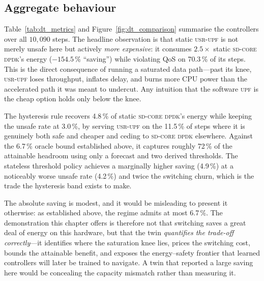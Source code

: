 \documentclass[12pt, a4paper]{report}
\newcommand{\dpdk}{\textsc{sd-core dpdk}}
\newcommand{\usr}{\textsc{usr-upf}}
\newcommand{\upf}{\textsc{upf}}
\begin{document}
\subsection{Aggregate behaviour}

Table~\ref{tab:dt_metrics} and Figure~\ref{fig:dt_comparison} summarise the
controllers over all $10{,}090$ steps. The headline observation is that static
\usr{} is not merely unsafe here but actively \emph{more expensive}: it
consumes $2.5\times$ static \dpdk{}'s energy ($-154.5$\,\% ``saving'') while
violating QoS on 70.3\,\% of its steps. This is the direct consequence of
running a saturated data path---past its knee, \usr{} loses throughput,
inflates delay, and burns more CPU power than the accelerated path it was
meant to undercut. Any intuition that the software \upf{} is the cheap option
holds only below the knee.

The hysteresis rule recovers 4.8\,\% of static \dpdk{}'s energy while keeping
the unsafe rate at 3.0\,\%, by serving \usr{} on the 11.5\,\% of steps where
it is genuinely both safe and cheaper and ceding to \dpdk{} elsewhere. Against
the 6.7\,\% oracle bound established above, it captures roughly 72\,\% of the
attainable headroom using only a forecast and two derived thresholds. The
stateless threshold policy achieves a marginally higher saving (4.9\,\%) at a
noticeably worse unsafe rate (4.2\,\%) and twice the switching churn, which is
the trade the hysteresis band exists to make.

The absolute saving is modest, and it would be misleading to present it
otherwise: as established above, the regime admits at most 6.7\,\%. The
demonstration this chapter offers is therefore not that switching saves a
great deal of energy on this hardware, but that the twin \emph{quantifies the
trade-off correctly}---it identifies where the saturation knee lies, prices
the switching cost, bounds the attainable benefit, and exposes the
energy--safety frontier that learned controllers will later be trained to
navigate. A twin that reported a large saving here would be concealing the
capacity mismatch rather than measuring it.
\end{document}
